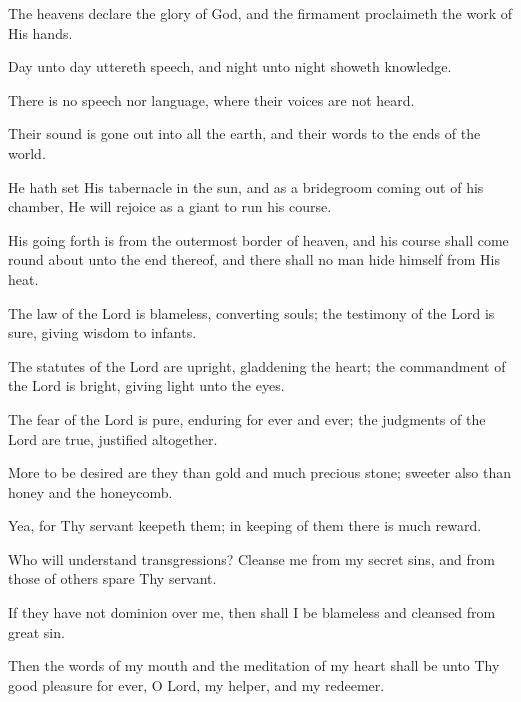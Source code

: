 The heavens declare the glory of God, and the firmament proclaimeth the work of His hands.

Day unto day uttereth speech, and night unto night showeth knowledge.

There is no speech nor language, where their voices are not heard.

Their sound is gone out into all the earth, and their words to the ends of the world.

He hath set His tabernacle in the sun, and as a bridegroom coming out of his chamber, He will rejoice as a giant to run his course.

His going forth is from the outermost border of heaven, and his course shall come round about unto the end thereof, and there shall no man hide himself from His heat.

The law of the Lord is blameless, converting souls; the testimony of the Lord is sure, giving wisdom to infants.

The statutes of the Lord are upright, gladdening the heart; the commandment of the Lord is bright, giving light unto the eyes.

The fear of the Lord is pure, enduring for ever and ever; the judgments of the Lord are true, justified altogether.

More to be desired are they than gold and much precious stone; sweeter also than honey and the honeycomb.

Yea, for Thy servant keepeth them; in keeping of them there is much reward.

Who will understand transgressions? Cleanse me from my secret sins, and from those of others spare Thy servant.

If they have not dominion over me, then shall I be blameless and cleansed from great sin.

Then the words of my mouth and the meditation of my heart shall be unto Thy good pleasure for ever, O Lord, my helper, and my redeemer.

